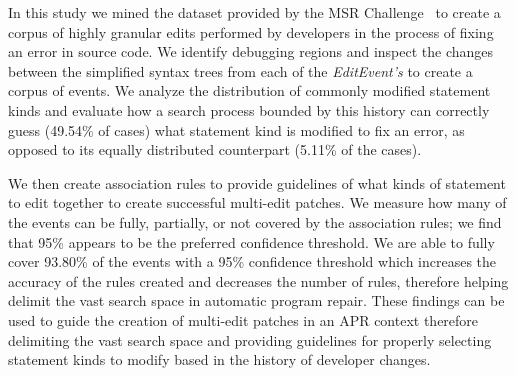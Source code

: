 \documentclass[sigconf]{acmart}
\begin{document}
In this study we mined the dataset provided by the MSR Challenge~\cite{msr18challenge}
to create a corpus of highly granular edits performed by developers in the process
of fixing an error in source code. We identify debugging
regions and inspect the changes between the simplified 
syntax trees from each
of the \textit{EditEvent's} to create a corpus of 
events.
We analyze the distribution of commonly modified statement kinds and evaluate
how a search process bounded by this history can correctly guess (49.54\% of 
cases) what statement kind is modified to fix an error, as opposed to its
equally distributed counterpart (5.11\% of the cases).

We then create association rules to provide guidelines of what kinds of
statement to edit together to create successful multi-edit patches. 
We measure how many of the events
can be fully, partially, or not covered by the association rules; we find that
95\% appears to be the preferred confidence threshold.
We are able to fully cover 93.80\% of the events with a 95\% confidence threshold
which increases the accuracy of the rules created and decreases the 
number of rules, therefore helping delimit the vast search space 
in automatic program repair. These findings can be used to guide the 
creation of multi-edit patches in an APR context therefore delimiting
the vast search space and providing guidelines for properly selecting
statement kinds to modify based in the history of developer changes.


\end{document}
